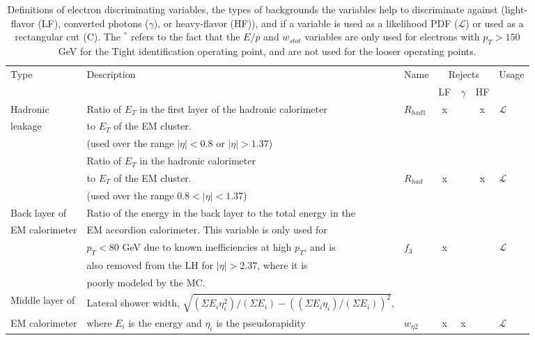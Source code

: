 \begin{table}
\begin{adjustwidth}{-1in}{-1in}
\caption{Definitions of electron discriminating variables, the types of backgrounds the variables help to discriminate against (light-flavor (LF), converted photons ($\gamma$), or heavy-flavor (HF)), and if a variable is used as a likelihood PDF ($\mathcal{L}$) or used as a rectangular cut (C). The $^{*}$ refers to the fact that the $E/p$ and $w_{stot}$ variables are
only used for electrons with $p_T > 150$ GeV for the Tight identification operating point, and are not used for the looser operating points.}
\label{tab:IDcuts}
\footnotesize
\begin{center}
\begin{tabular}{|l|l|l|c|c|c|l|}
\hline
Type & Description & Name &  \multicolumn{3}{c|}{Rejects} & Usage  \\
& & & LF & $\gamma$ & HF &\\
\hline
Hadronic & Ratio of $E_T$ in the first layer of the hadronic calorimeter  & $R_{had1}$ & x & & x & $\mathcal{L}$ \\ 
leakage & to $E_T$ of the EM cluster. & & & & & \\
& (used over the range $|\eta| < 0.8$ or $|\eta| > 1.37$)  & & & & & \\
\cline{2-7}
& Ratio of $E_T$ in the hadronic calorimeter &  & & & & \\
&  to $E_T$ of the EM cluster. & $R_{had}$ & x & & x & $\mathcal{L}$  \\
& (used over the range $0.8 <|\eta| < 1.37$) & & & & & \\
\hline
Back layer of  & Ratio of the energy in the back layer to the total energy in the & & & & &\\
EM calorimeter & EM accordion calorimeter. This variable is only used for & & & & & \\
               & $p_T < 80$ GeV due to known inefficiencies at high $p_T$, and is& $f_3$ & x & & & $\mathcal{L}$ \\
             & also removed from the LH for $|\eta| > 2.37$, where it is& & & & & \\
              & poorly modeled by the MC. & & & & & \\
\hline
Middle layer of  & Lateral shower width, $\sqrt{(\Sigma E_i \eta_i^2)/(\Sigma E_i) -((\Sigma E_i\eta_i)/(\Sigma E_i))^2}$, & & & & & \\
EM calorimeter  & where $E_i$ is the energy and $\eta_i$ is the pseudorapidity  & $w_{\eta 2}$ & x & x & & $\mathcal{L}$ \\

\end{tabular}
\end{center}
\end{adjustwidth}
\end{table}
